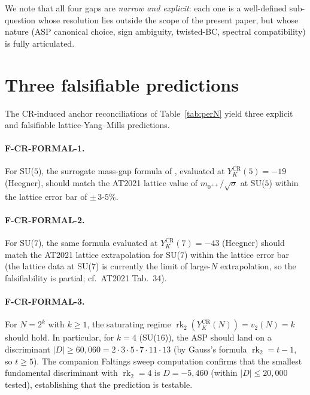 \documentclass[11pt,a4paper,reqno]{amsart}
\theoremstyle{definition}
\DeclareMathOperator{\rk}{rk}
\newcommand{\YKCR}{Y_K^{\mathrm{CR}}}
\newcommand{\vtwo}{v_2}
\begin{document}
\medskip

We note that all four gaps are \emph{narrow and explicit}: each one is a
well-defined sub-question whose resolution lies outside the scope of the
present paper, but whose nature (ASP canonical choice, sign ambiguity,
twisted-BC, spectral compatibility) is fully articulated.

\section{Three falsifiable predictions}\label{sec:falsif}

The CR-induced anchor reconciliations of Table~\ref{tab:perN} yield three
explicit and falsifiable lattice-Yang--Mills predictions.

\paragraph{F-CR-FORMAL-1.}
For SU($5$), the surrogate mass-gap formula of \cite{Remondiere2026Selberg}, evaluated at $\YKCR(5) = -19$ (Heegner), should match the AT2021 lattice
value of $m_{0^{++}}/\sqrt{\sigma}$ at SU($5$) within the lattice error bar of
$\pm\,3$-$5\%$.

\paragraph{F-CR-FORMAL-2.}
For SU($7$), the same formula evaluated at $\YKCR(7) = -43$ (Heegner) should match the AT2021 lattice extrapolation for SU($7$) within the lattice error bar (the lattice data at SU($7$) is currently the limit of large-$N$ extrapolation, so the falsifiability is partial; cf.\ AT2021 Tab.~34).

\paragraph{F-CR-FORMAL-3.}
For $N = 2^k$ with $k\ge 1$, the saturating regime $\rk_2(\YKCR(N)) = \vtwo(N) = k$ should hold. In particular, for $k=4$ (SU($16$)), the ASP should land on a discriminant $|D|\ge 60{,}060 = 2\cdot 3\cdot 5\cdot 7\cdot 11\cdot 13$ (by Gauss's formula $\rk_2 = t - 1$, so $t \ge 5$). The companion Faltings sweep computation \cite{Remondiere2026Faltings} confirms that the smallest fundamental discriminant with $\rk_2 = 4$ is $D = -5{,}460$ (within $|D| \le 20{,}000$ tested), establishing that the prediction is testable.
\end{document}
